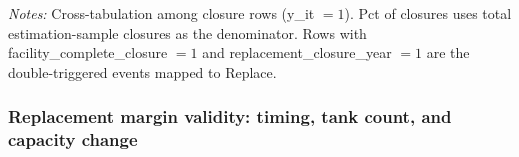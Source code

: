 \documentclass[
  11pt,
]{article}
\begin{document}
\vspace{0.1cm}
\begin{flushleft}
\footnotesize
\textit{Notes:} Cross-tabulation among closure rows (y\_it $=1$). Pct of closures uses total estimation-sample closures as the denominator. Rows with facility\_complete\_closure $=1$ and replacement\_closure\_year $=1$ are the double-triggered events mapped to Replace.
\end{flushleft}

\subsubsection{Replacement margin validity: timing, tank count, and
capacity change}\label{sec-t011-a5}

\begingroup\fontsize{9}{11}\selectfont
\end{document}
